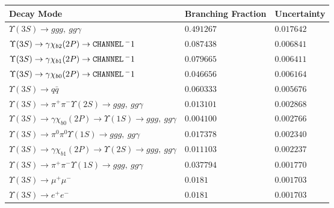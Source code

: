 \documentclass[12pt]{article}
\begin{document}
\begin{tabular}{p{4.7in} l l}
Decay Mode & Branching Fraction & Uncertainty \\ \hline
$   \Upsilon(3S) \to ggg,\ gg\gamma                                                                                       $ & $   0.491267        $ & $   0.017642      $ \\ 
$   \Upsilon(3S) \to \gamma \chi_{b2}(2P) \to {\tt \small CHANNEL} \, ^-1                                                           $ & $   0.087438                  $ & $   0.006841      $ \\ 
$   \Upsilon(3S) \to \gamma \chi_{b1}(2P) \to {\tt \small CHANNEL} \, ^-1                                                           $ & $   0.079665       $ & $   0.006411      $ \\ 
$   \Upsilon(3S) \to \gamma \chi_{b0}(2P) \to {\tt \small CHANNEL} \, ^-1                                                           $ & $   0.046656                  $ & $   0.006164     $ \\ 
$   \Upsilon(3S) \to q\bar{q}                                                                                            $ & $   0.060333       $ & $   0.005676      $ \\ 
$   \Upsilon(3S) \to \pi^+ \pi^- \Upsilon(2S) \to ggg,\ gg\gamma                                                          $ & $   0.013101        $ & $   0.002868      $ \\ 
$   \Upsilon(3S) \to \gamma \chi_{b0}(2P) \to \Upsilon(1S) \to ggg,\ gg\gamma                                             $ & $   0.004100      $ & $   0.002766     $ \\ 
$   \Upsilon(3S) \to \pi^0 \pi^0 \Upsilon(1S) \to ggg,\ gg\gamma                                                          $ & $   0.017378      $ & $   0.002340      $ \\ 
$   \Upsilon(3S) \to \gamma \chi_{b1}(2P) \to \Upsilon(2S) \to ggg,\ gg\gamma                                             $ & $   0.011103      $ & $   0.002237     $ \\ 
$   \Upsilon(3S) \to \pi^+ \pi^- \Upsilon(1S) \to ggg,\ gg\gamma                                                          $ & $   0.037794       $ & $   0.001770      $ \\ 
$   \Upsilon(3S) \to \mu^+ \mu^-                                                                                         $ & $   0.0181                    $ & $   0.001703     $ \\ 
$   \Upsilon(3S) \to e^+ e^-                                                                                             $ & $   0.0181                    $ & $   0.001703     $ \\ 

\end{tabular}
\end{document}
